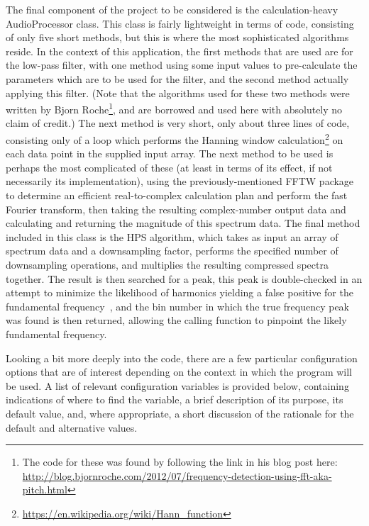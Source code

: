 \documentclass[12pt]{report}
\begin{document}
\indent The final component of the project to be considered is the calculation-heavy AudioProcessor class. This class is fairly lightweight in terms of code, consisting of only five short methods, but this is where the most sophisticated algorithms reside. In the context of this application, the first methods that are used are for the low-pass filter, with one method using some input values to pre-calculate the parameters which are to be used for the filter, and the second method actually applying this filter. (Note that the algorithms used for these two methods were written by Bjorn Roche\footnote{The code for these was found by following the link in his blog post here: \url{http://blog.bjornroche.com/2012/07/frequency-detection-using-fft-aka-pitch.html}}, and are borrowed and used here with absolutely no claim of credit.) The next method is very short, only about three lines of code, consisting only of a loop which performs the Hanning window calculation\footnote{\url{https://en.wikipedia.org/wiki/Hann_function}} on each data point in the supplied input array. The next method to be used is perhaps the most complicated of these (at least in terms of its effect, if not necessarily its implementation), using the previously-mentioned FFTW package to determine an efficient real-to-complex calculation plan and perform the fast Fourier transform, then taking the resulting complex-number output data and calculating and returning the magnitude of this spectrum data. The final method included in this class is the HPS algorithm, which takes as input an array of spectrum data and a downsampling factor, performs the specified number of downsampling operations, and multiplies the resulting compressed spectra together. The result is then searched for a peak, this peak is double-checked in an attempt to minimize the likelihood of harmonics yielding a false positive for the fundamental frequency~\cite{delaCuadra2001}, and the bin number in which the true frequency peak was found is then returned, allowing the calling function to pinpoint the likely fundamental frequency.

\indent Looking a bit more deeply into the code, there are a few particular configuration options that are of interest depending on the context in which the program will be used. A list of relevant configuration variables is provided below, containing indications of where to find the variable, a brief description of its purpose, its default value, and, where appropriate, a short discussion of the rationale for the default and alternative values.
\end{document}
